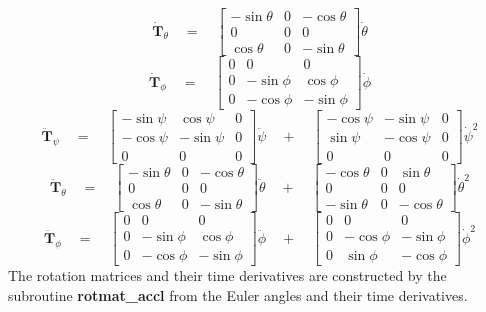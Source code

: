 \begin{equation*}
\dot{\textbf{T}}_\theta \quad  = \quad  \begin{bmatrix} -\sin \theta & 0 & -\cos \theta \\ 0 & 0 & 0 \\ \cos \theta & 0 & -\sin \theta \end{bmatrix} \dot{\theta}
\end{equation*}
\begin{equation*}
\dot{\textbf{T}}_\phi \quad = \quad \begin{bmatrix} 0 & 0 & 0 \\ 0 & -\sin \phi & \cos \phi \\ 0 & -\cos \phi & -\sin \phi \end{bmatrix} \dot{\phi}
\end{equation*}
\begin{equation*}
\ddot{\textbf{T}}_\psi \quad = \quad \begin{bmatrix} -\sin \psi & \cos \psi & 0 \\ -\cos \psi & -\sin \psi & 0 \\ 0 & 0 & 0 \end{bmatrix} \ddot{\psi} \quad + \quad \begin{bmatrix} -\cos \psi & -\sin \psi & 0 \\ \sin \psi & -\cos \psi & 0 \\ 0 & 0 & 0 \end{bmatrix} \dot{\psi}^2
\end{equation*}
\begin{equation*}
\ddot{\textbf{T}}_\theta \quad  = \quad \begin{bmatrix} -\sin \theta & 0 & -\cos \theta \\ 0 & 0 & 0 \\ \cos \theta & 0 & -\sin \theta \end{bmatrix} \ddot{\theta} \quad + \quad \begin{bmatrix} -\cos \theta & 0 & \sin \theta \\ 0 & 0 & 0 \\-\sin \theta & 0 & -\cos \theta \end{bmatrix} \dot{\theta}^2
\end{equation*}
\begin{equation*}
\ddot{\textbf{T}}_\phi \quad = \quad \begin{bmatrix} 0 & 0 & 0 \\ 0 & -\sin \phi & \cos \phi \\ 0 & -\cos \phi & -\sin \phi \end{bmatrix} \ddot{\phi} \quad + \quad                  \begin{bmatrix} 0 & 0 & 0 \\ 0 & -\cos \phi &-\sin \phi \\ 0 &  \sin \phi & -\cos \phi \end{bmatrix} \dot{\phi}^2
\end{equation*}
The rotation matrices and their time derivatives are constructed by the subroutine \textbf{rotmat\_accl} from the Euler angles and their time derivatives.

